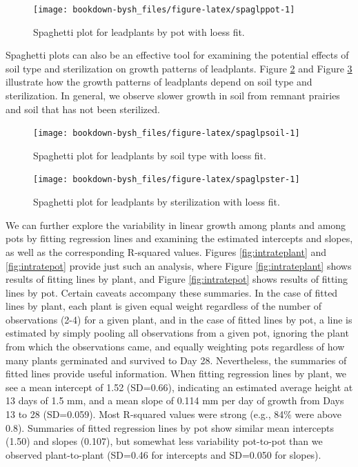 \documentclass[
]{krantz}
\begin{document}
\begin{figure}

{\centering \texttt{[image: bookdown-bysh\_files/figure-latex/spaglppot-1]} 

}

\caption{Spaghetti plot for leadplants by pot with loess fit.}\label{fig:spaglppot}
\end{figure}

Spaghetti plots can also be an effective tool for examining the potential effects of soil type and sterilization on growth patterns of leadplants. Figure \ref{fig:spaglpsoil} and Figure \ref{fig:spaglpster} illustrate how the growth patterns of leadplants depend on soil type and sterilization. In general, we observe slower growth in soil from remnant prairies and soil that has not been sterilized.

\begin{figure}

{\centering \texttt{[image: bookdown-bysh\_files/figure-latex/spaglpsoil-1]} 

}

\caption{Spaghetti plot for leadplants by soil type with loess fit.}\label{fig:spaglpsoil}
\end{figure}

\begin{figure}

{\centering \texttt{[image: bookdown-bysh\_files/figure-latex/spaglpster-1]} 

}

\caption{Spaghetti plot for leadplants by sterilization with loess fit.}\label{fig:spaglpster}
\end{figure}

We can further explore the variability in linear growth among plants and among pots by fitting regression lines and examining the estimated intercepts and slopes, as well as the corresponding R-squared values. Figures \ref{fig:intrateplant} and \ref{fig:intratepot} provide just such an analysis, where Figure \ref{fig:intrateplant} shows results of fitting lines by plant, and Figure \ref{fig:intratepot} shows results of fitting lines by pot. Certain caveats accompany these summaries. In the case of fitted lines by plant, each plant is given equal weight regardless of the number of observations (2-4) for a given plant, and in the case of fitted lines by pot, a line is estimated by simply pooling all observations from a given pot, ignoring the plant from which the observations came, and equally weighting pots regardless of how many plants germinated and survived to Day 28. Nevertheless, the summaries of fitted lines provide useful information. When fitting regression lines by plant, we see a mean intercept of 1.52 (SD=0.66), indicating an estimated average height at 13 days of 1.5 mm, and a mean slope of 0.114 mm per day of growth from Days 13 to 28 (SD=0.059). Most R-squared values were strong (e.g., 84\% were above 0.8). Summaries of fitted regression lines by pot show similar mean intercepts (1.50) and slopes (0.107), but somewhat less variability pot-to-pot than we observed plant-to-plant (SD=0.46 for intercepts and SD=0.050 for slopes).
\end{document}
